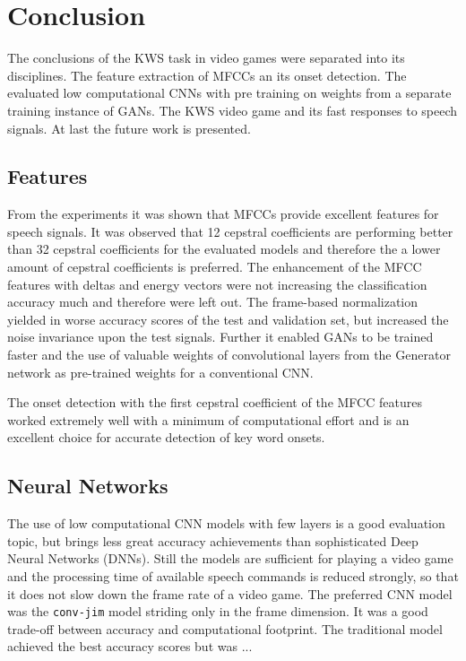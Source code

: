 
\chapter{Conclusion}\label{sec:conclusion}
The conclusions of the KWS task in video games were separated into its disciplines.
The feature extraction of MFCCs an its onset detection.
The evaluated low computational CNNs with pre training on weights from a separate training instance of GANs.
The KWS video game and its fast responses to speech signals.
At last the future work is presented.


\section{Features}
\thesisStateNotReady
From the experiments it was shown that MFCCs provide excellent features for speech signals.
It was observed that 12 cepstral coefficients are performing better than 32 cepstral coefficients for the evaluated models and therefore the a lower amount of cepstral coefficients is preferred.
The enhancement of the MFCC features with deltas and energy vectors were not increasing the classification accuracy much and therefore were left out.
The frame-based normalization yielded in worse accuracy scores of the test and validation set, but increased the noise invariance upon the test signals.
Further it enabled GANs to be trained faster and the use of valuable weights of convolutional layers from the Generator network as pre-trained weights for a conventional CNN.

The onset detection with the first cepstral coefficient of the MFCC features worked extremely well with a minimum of computational effort and is an excellent choice for accurate detection of key word onsets.



\section{Neural Networks}
\thesisStateNotReady
The use of low computational CNN models with few layers is a good evaluation topic, but brings less great accuracy achievements than sophisticated Deep Neural Networks (DNNs).
Still the models are sufficient for playing a video game and the processing time of available speech commands is reduced strongly, so that it does not slow down the frame rate of a video game.
The preferred CNN model was the \texttt{conv-jim} model striding only in the frame dimension. It was a good trade-off between accuracy and computational footprint.
The traditional model achieved the best accuracy scores but was ...

